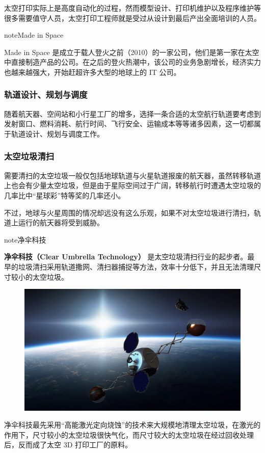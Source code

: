 \documentclass[letterpaper,10pt]{sphinxmanual}
\begin{document}
太空打印实际上是高度自动化的过程，然而模型设计、打印机维护以及程序维护等很多需要值守人员，太空打印工程师就是受过从设计到最后产出全面培训的人员。

\begin{notice}{note}{Made in Space}

Made in Space 是成立于载人登火之前（2010）的一家公司，他们是第一家在太空中直接制造产品的公司。在之后的登火热潮中，该公司的业务急剧增长，经济实力也越来越强大，开始赶超许多大型的地球上的 IT 公司。
\end{notice}


\subsubsection{轨道设计、规划与调度}
\label{profession:id8}
随着航天器、空间站和小行星工厂的增多，选择一条合适的太空航行轨道要考虑到发射窗口、燃料消耗、航行时间、飞行安全、运输成本等等诸多因素，这一切都属于轨道设计、规划与调度工作。


\subsubsection{太空垃圾清扫}
\label{profession:id9}
需要清扫的太空垃圾一般仅包括地球轨道与火星轨道报废的航天器，虽然转移轨道上也会有少量太空垃圾，但是由于星际空间过于广阔，转移航行时遭遇太空垃圾的几率比中“星球彩”特等奖的几率还小。

不过，地球与火星周围的情况却远没有这么乐观，如果不对太空垃圾进行清扫，轨道上运行的航天器将受到威胁。

\begin{notice}{note}{净伞科技}

\textbf{净伞科技（Clear Umbrella Technology）} 是太空垃圾清扫行业的起步者。最早的垃圾清扫采用轨道撒网、清扫器捕捉等方法，效率十分低下，并且无法清理尺寸较小的太空垃圾。
\begin{figure}[htbp]
\centering

\includegraphics{1280px-Sling-Sat_removing_space_debris.png}
\end{figure}

净伞科技最先采用“高能激光定向烧蚀”的技术来大规模地清理太空垃圾，在激光的作用下，尺寸较小的太空垃圾很快气化，而尺寸较大的太空垃圾在经过回收处理后，反而成了太空 3D 打印工厂的原料。
\end{notice}
\end{document}
